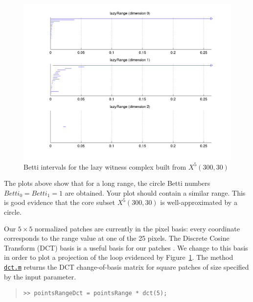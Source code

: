 \documentclass[amscd, amssymb, verbatim]{amsart}[12pt]
\theoremstyle{remark}
\theoremstyle{remark}
\theoremstyle{remark}
\begin{document}
\begin{figure}[htp]
	\begin{center}
    	\includegraphics[width=6in]{lazyRange.png}
   	\end{center}
	\caption{Betti intervals for the lazy witness complex built from $X^5(300,30)$}
  	\label{fig:rangeBetti}
\end{figure}
\FloatBarrier

The plots above show that for a long range, the circle Betti numbers $Betti_0 = Betti_1 = 1$ are obtained. Your plot should contain a similar range. This is good evidence that the core subset $X^5(300,30)$ is well-approximated by a circle. 

Our $5\times 5$ normalized patches are currently in the pixel basis: every coordinate corresponds to the range value at one of the 25 pixels. The Discrete Cosine Transform (DCT) basis is a useful basis for our patches \citep{Range, Mumford}. We change to this basis in order to plot a projection of the loop evidenced by Figure~\ref{fig:rangeBetti}. The method \href{https://github.com/appliedtopology/javaplex/tree/master/src/matlab/for_distribution/tutorial_examples/dct.m}{\texttt{dct.m}} returns the DCT change-of-basis matrix for square patches of size specified by the input parameter.

\begin{quote} \begin{verbatim} 
>> pointsRangeDct = pointsRange * dct(5);
\end{verbatim} \end{quote}
\end{document}
